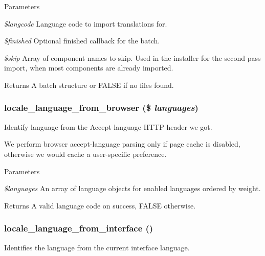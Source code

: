 \begin{DoxyParams}{Parameters}
\item[{\em \$langcode}]Language code to import translations for. \item[{\em \$finished}]Optional finished callback for the batch. \item[{\em \$skip}]Array of component names to skip. Used in the installer for the second pass import, when most components are already imported.\end{DoxyParams}
\begin{DoxyReturn}{Returns}
A batch structure or FALSE if no files found. 
\end{DoxyReturn}
\hypertarget{group__locale_ga07f1b17e9dd116d07f6a2a02bfd6915e}{
\subsubsection[{locale\_\-language\_\-from\_\-browser}]{\setlength{\rightskip}{0pt plus 5cm}locale\_\-language\_\-from\_\-browser (\$ {\em languages})}}
\label{group__locale_ga07f1b17e9dd116d07f6a2a02bfd6915e}
Identify language from the Accept-\/language HTTP header we got.

We perform browser accept-\/language parsing only if page cache is disabled, otherwise we would cache a user-\/specific preference.


\begin{DoxyParams}{Parameters}
\item[{\em \$languages}]An array of language objects for enabled languages ordered by weight.\end{DoxyParams}
\begin{DoxyReturn}{Returns}
A valid language code on success, FALSE otherwise. 
\end{DoxyReturn}
\hypertarget{group__locale_ga951d63c38235f5186fe6165589c4303f}{
\subsubsection[{locale\_\-language\_\-from\_\-interface}]{\setlength{\rightskip}{0pt plus 5cm}locale\_\-language\_\-from\_\-interface ()}}
\label{group__locale_ga951d63c38235f5186fe6165589c4303f}
Identifies the language from the current interface language.

